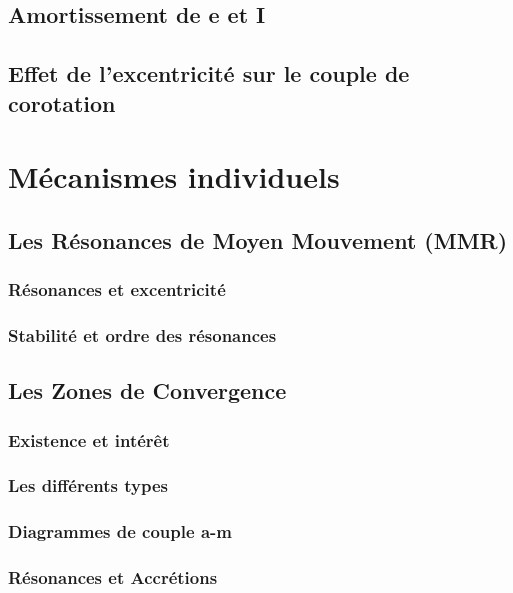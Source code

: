 \documentclass[a4paper,twoside]{report}
\begin{document}
\section{Amortissement de e et I}
\section{Effet de l'excentricité sur le couple de corotation}

\chapter{Mécanismes individuels}
\section{Les Résonances de Moyen Mouvement (MMR)}
\subsection{Résonances et excentricité}
\subsection{Stabilité et ordre des résonances}

\section{Les Zones de Convergence}
\subsection{Existence et intérêt}
\subsection{Les différents types}
\subsection{Diagrammes de couple a-m}
\subsection{Résonances et Accrétions}
\end{document}
